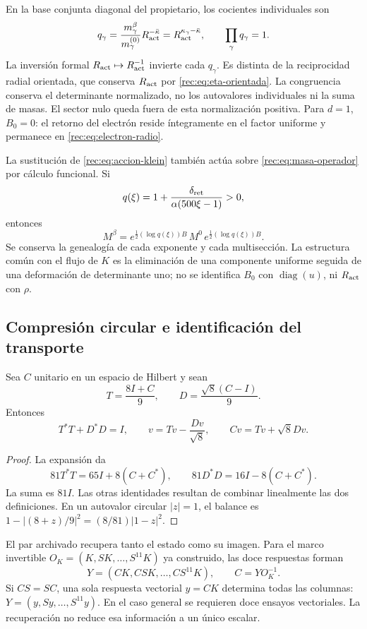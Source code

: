 En la base conjunta diagonal del propietario, los cocientes individuales son
\[
 q_\gamma=\frac{m_\gamma^\beta}{m_\gamma^{(0)}}R_{\rm act}^{-\bar\kappa}
 =R_{\rm act}^{\kappa_\gamma-\bar\kappa},\qquad
 \prod_\gamma q_\gamma=1.
\]
La inversión formal \(R_{\rm act}\mapsto R_{\rm act}^{-1}\) invierte cada \(q_\gamma\). Es distinta de la reciprocidad radial orientada, que conserva \(R_{\rm act}\) por \eqref{rec:eq:eta-orientada}. La congruencia conserva el determinante normalizado, no los autovalores individuales ni la suma de masas. El sector nulo queda fuera de esta normalización positiva. Para \(d=1\), \(B_0=0\): el retorno del electrón reside íntegramente en el factor uniforme y permanece en \eqref{rec:eq:electron-radio}.

La sustitución de \eqref{rec:eq:accion-klein} también actúa sobre \eqref{rec:eq:masa-operador} por cálculo funcional. Si
\[
 q(\xi)=1+\frac{\delta_{\rm ret}}{\alpha(500\xi-1)}>0,
\]
entonces
\[
 M^\beta=e^{\frac12(\log q(\xi))B}\,M^0\,
          e^{\frac12(\log q(\xi))B}.
\]
Se conserva la genealogía de cada exponente y cada multisección. La estructura común con el flujo de \(K\) es la eliminación de una componente uniforme seguida de una deformación de determinante uno; no se identifica \(B_0\) con \(\operatorname{diag}(u)\), ni \(R_{\rm act}\) con \(\rho\).

\subsection{Compresión circular e identificación del transporte}

\begin{theorem}
\label{rec:thm:operador}
Sea \(C\) unitario en un espacio de Hilbert y sean
\[
 T=\frac{8I+C}{9},\qquad D=\frac{\sqrt8(C-I)}9.
\]
Entonces
\begin{equation}
 T^*T+D^*D=I,\qquad
 v=Tv-\frac{Dv}{\sqrt8},\qquad Cv=Tv+\sqrt8Dv.
 \label{rec:eq:unitario}
\end{equation}
\end{theorem}
\begin{proof}
La expansión da
\[
 81T^*T=65I+8(C+C^*),\qquad
 81D^*D=16I-8(C+C^*).
\]
La suma es \(81I\). Las otras identidades resultan de combinar linealmente las dos definiciones. En un autovalor circular \(|z|=1\), el balance es
\(1-|(8+z)/9|^2=(8/81)|1-z|^2\).
\end{proof}

El par archivado recupera tanto el estado como su imagen. Para el marco invertible \(O_K=(K,SK,\ldots,S^{11}K)\) ya construido, las doce respuestas forman
\[
 Y=(CK,CSK,\ldots,CS^{11}K),\qquad C=YO_K^{-1}.
\]
Si \(CS=SC\), una sola respuesta vectorial \(y=CK\) determina todas las columnas: \(Y=(y,Sy,\ldots,S^{11}y)\). En el caso general se requieren doce ensayos vectoriales. La recuperación no reduce esa información a un único escalar.


